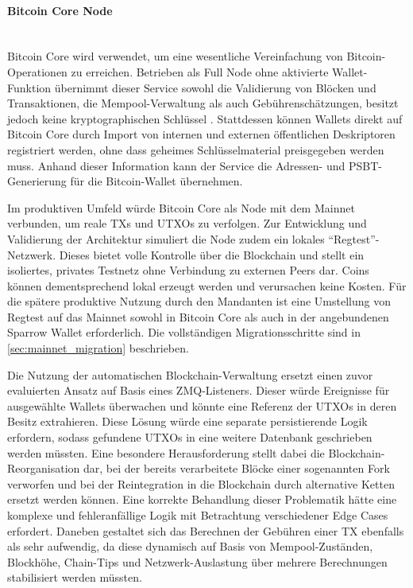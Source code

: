\paragraph{Bitcoin Core Node} \mbox{}\\
Bitcoin Core wird verwendet, um eine wesentliche Vereinfachung von Bitcoin-Operationen zu erreichen. Betrieben als Full Node ohne aktivierte Wallet-Funktion übernimmt dieser Service sowohl die Validierung von Blöcken und Transaktionen, die Mempool-Verwaltung als auch Gebührenschätzungen, besitzt jedoch keine kryptographischen Schlüssel \cite{bitcoin_core_docs,Sparrow_Wallets_Node_Connect}.
Stattdessen können Wallets direkt auf Bitcoin Core durch Import von internen und externen öffentlichen Deskriptoren registriert werden, ohne dass geheimes Schlüsselmaterial preisgegeben werden muss. Anhand dieser Information kann der Service die Adressen- und \ac{PSBT}-Generierung für die Bitcoin-Wallet übernehmen.\cite{bitcoincoreImportDescriptors}

Im produktiven Umfeld würde Bitcoin Core als Node mit dem Mainnet verbunden, um reale \acp{TX} und \acp{UTXO} zu verfolgen. Zur Entwicklung und Validierung der Architektur simuliert die Node zudem ein lokales \enquote{Regtest}-Netzwerk. Dieses bietet volle Kontrolle über die Blockchain und stellt ein isoliertes, privates Testnetz ohne Verbindung zu externen Peers dar. Coins können dementsprechend lokal erzeugt werden und verursachen keine Kosten.
Für die spätere produktive Nutzung durch den Mandanten ist eine Umstellung von Regtest auf das Mainnet sowohl in Bitcoin Core als auch in der angebundenen Sparrow Wallet erforderlich. Die vollständigen Migrationsschritte sind in \ref{sec:mainnet_migration} beschrieben.

Die Nutzung der automatischen Blockchain-Verwaltung ersetzt einen zuvor evaluierten Ansatz auf Basis eines \ac{ZMQ}-Listeners. Dieser würde Ereignisse für ausgewählte Wallets überwachen und könnte eine Referenz der \acp{UTXO} in deren Besitz extrahieren. Diese Lösung würde eine separate persistierende Logik erfordern, sodass gefundene \acp{UTXO} in eine weitere Datenbank geschrieben werden müssten. Eine besondere Herausforderung stellt dabei die Blockchain-Reorganisation dar, bei der bereits verarbeitete Blöcke einer sogenannten Fork verworfen und bei der Reintegration in die Blockchain durch alternative Ketten ersetzt werden können. Eine korrekte Behandlung dieser Problematik hätte eine komplexe und fehleranfällige Logik mit Betrachtung verschiedener Edge Cases erfordert. Daneben gestaltet sich das Berechnen der Gebühren einer \ac{TX} ebenfalls als sehr aufwendig, da diese dynamisch auf Basis von Mempool-Zuständen, Blockhöhe, Chain-Tips und Netzwerk-Auslastung über mehrere Berechnungen stabilisiert werden müssten.

